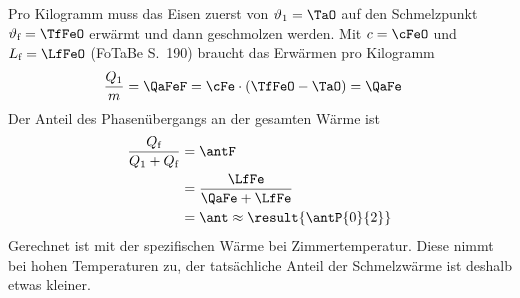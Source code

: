 Pro Kilogramm muss das Eisen zuerst von $\vartheta_1 = \TaO$ auf den Schmelzpunkt $\vartheta_\text{f} = \TfFeO$ erwärmt und dann geschmolzen werden. Mit $c = \cFeO$ und $L_\text{f} = \LfFeO$ (FoTaBe S.~190) braucht das Erwärmen pro Kilogramm
\begin{align}
 \frac{Q_1}{m} &= \QaFeF = \cFe\cdot\left(\TfFeO-\TaO\right) = \QaFe
\end{align}
Der Anteil des Phasenübergangs an der gesamten Wärme ist
\begin{align}
 \frac{Q_\text{f}}{Q_1+Q_\text{f}} &= \antF \\
   &= \frac{\LfFe}{\QaFe+\LfFe} \\
   &= \ant \approx \result{\antP{0}{2}}
\end{align}
Gerechnet ist mit der spezifischen Wärme bei Zimmertemperatur. Diese nimmt bei hohen Temperaturen zu, der tatsächliche Anteil der Schmelzwärme ist deshalb etwas kleiner.
